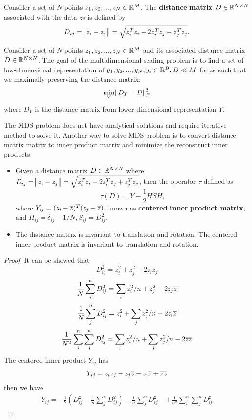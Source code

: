 \begin{refsection}
\begin{definition}\cite[398]{borg2005modern}
Consider a set of $N$ points $z_1,z_2,...,z_N \in \mathbb{R}^M$. The \textbf{distance matrix} $D\in \mathbb{R}^{N\times N}$ associated with the data $z$s is defined by $$D_{ij} = \norm{z_i-z_j} =\sqrt{ z_i^Tz_i - 2z_i^Tz_j + z_j^Tz_j}.$$
\end{definition}





\begin{definition}
Consider a set of $N$ points $z_1,z_2,...,z_N \in \mathbb{R}^M$ and its associated distance matrix $D\in \mathbb{R}^{N\times N}$.  The goal of the multidimensional scaling problem is to find a set of low-dimensional representation of $y_1,y_2,...,y_N, y_i\in \mathbb{R}^D, D\ll M$ for $z$s such that we maximally preserving the distance matrix:
$$\min_{Y} \norm{D_Y - D}_F^2$$
where $D_Y$ is the distance matrix from lower dimensional representation $Y$.
\end{definition}

\begin{remark}
The MDS problem does not have analytical solutions and require iterative method to solve it. 
Another way to solve MDS problem is to convert distance matrix matrix to inner product matrix and minimize the reconstruct inner products.
\end{remark}


\begin{lemma}\cite[398]{borg2005modern}\hfill
\begin{itemize}
	\item Given a distance matrix $D\in \mathbb{R}^{N\times N}$ where $D_{ij} = \norm{z_i-z_j} =\sqrt{ z_i^Tz_i - 2z_i^Tz_j + z_j^Tz_j}$, then the operator $\tau$ defined as $$\tau(D) = Y -\frac{1}{2}HSH,$$ 
	where $Y_{ij} = (z_i - \overline{z})^T(z_j - \overline{z})$, known as \textbf{centered inner product matrix}, and $H_{ij} = \delta_{ij} - 1/N,S_{ij}=D_{ij}^2.$
	\item The distance matrix is invariant to translation and rotation. 
	The centered inner product matrix is invariant to translation and rotation.
\end{itemize}	

\end{lemma}
\begin{proof}
It can be showed that
$$D_{ij}^2=z_i^2+z_j^2-2z_iz_j$$
$$\frac{1}{N}\sum_{i}^n D_{ij}^2 = \sum_i z_i^2/n + z_j^2 - 2z_j\overline{z}$$
$$\frac{1}{N}\sum_{j}^n D_{ij}^2 = z_i^2 + \sum_j z_j^2/n - 2z_i\overline{z}$$
$$\frac{1}{N^2}\sum_{i}^n\sum_{j}^n D_{ij}^2 = \sum_iz_i^2/n + \sum_jz_j^2/n - 2\overline{z}\overline{z}$$
The centered inner product $Y_{ij}$ has
$$Y_{ij}=z_iz_j - z_j\overline{z} - z_i\overline{z} +\overline{z}\overline{z}$$
then we have
\begin{align*}
Y_{ij} = -\frac{1}{2}(D_{ij}^2 - \frac{1}{n}\sum_{j}^n D_{ij}^2)-\frac{1}{n}\sum_{j}^n D_{ij}^2-
+\frac{1}{n^2}\sum_{i}^n\sum_{j}^n D_{ij}^2
\end{align*}
\end{proof}



\end{refsection}
